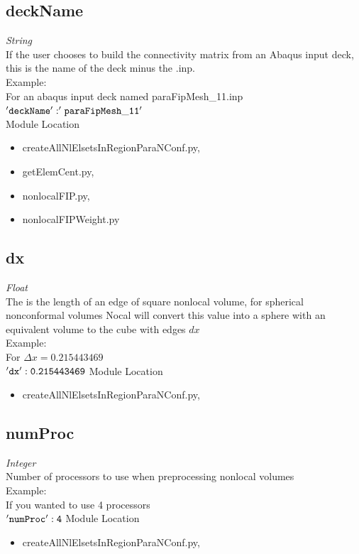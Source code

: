 \documentclass[11pt]{article}
\begin{document}
\subsection{deckName}
\emph{String} \\
If the user chooses to build the connectivity matrix from an Abaqus input deck, this is the name of the deck minus the .inp.\\
Example:\\
For an abaqus input deck named paraFipMesh\_11.inp \\
{$\tt{'deckName' : 'paraFipMesh\_11'}$}\\
Module Location\\
\begin{itemize}
  \item createAllNlElsetsInRegionParaNConf.py,
  \item getElemCent.py,
  \item nonlocalFIP.py,
  \item nonlocalFIPWeight.py
\end{itemize}
\subsection{dx}
\emph{Float} \\
The is the length of an edge of square nonlocal volume, for spherical nonconformal volumes Nocal will convert this value into a sphere with an equivalent volume to the cube with edges $dx$ \\
Example:\\
For $\Delta x = 0.215443469$ \\
$\tt{'dx' : 0.215443469}$
Module Location\\
\begin{itemize}
  \item createAllNlElsetsInRegionParaNConf.py,
\end{itemize}
\subsection{numProc}
\emph{Integer} \\
Number of processors to use when preprocessing nonlocal volumes \\
Example:\\
If you wanted to use 4 processors \\
$\tt{'numProc' : 4}$
Module Location\\
\begin{itemize}
  \item createAllNlElsetsInRegionParaNConf.py,
\end{itemize}
\end{document}

